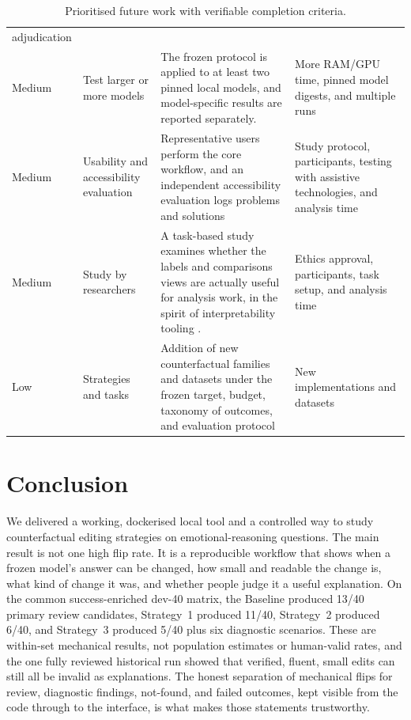 \documentclass[11pt,a4paper]{article}
\begin{document}
\begin{table}[!htbp]
\begin{tabularx}{\textwidth}{@{}L{1.05cm}L{2.5cm}Y Y@{}}
adjudication \\
Medium & Test larger or more models & The frozen protocol is applied to at least two
pinned local models, and model-specific results are reported separately. & More
RAM/GPU time, pinned model digests, and multiple runs \\
Medium & Usability and accessibility evaluation & Representative users perform the
core workflow, and an independent accessibility evaluation logs problems and solutions
& Study protocol, participants, testing with assistive technologies, and analysis time \\
Medium & Study by researchers & A task-based study examines whether the labels and
comparisons views are actually useful for analysis work, in the spirit of
interpretability tooling \cite{tenney2020}. & Ethics approval, participants, task setup, and analysis
time \\
Low & Strategies and tasks & Addition of new counterfactual families and datasets under
the frozen target, budget, taxonomy of outcomes, and evaluation protocol & New
implementations and datasets \\
\bottomrule
\end{tabularx}
\caption{Prioritised future work with verifiable completion criteria.}
\label{tab:future}
\end{table}

\clearpage

\section{Conclusion}

We delivered a working, dockerised local tool and a controlled way to study
counterfactual editing strategies on emotional-reasoning questions. The main result is
not one high flip rate. It is a reproducible workflow that shows when a frozen model's
answer can be changed, how small and readable the change is, what kind of change it
was, and whether people judge it a useful explanation. On the common success-enriched
dev-40 matrix, the Baseline produced 13/40 primary review candidates, Strategy~1
produced 11/40, Strategy~2 produced 6/40, and Strategy~3 produced 5/40 plus six
diagnostic scenarios. These are within-set mechanical results, not population estimates
or human-valid rates, and the one fully reviewed historical run showed that verified,
fluent, small edits can still all be invalid as explanations. The honest separation of
mechanical flips for review, diagnostic findings, not-found, and failed outcomes, kept
visible from the code through to the interface, is what makes those statements
trustworthy.
\end{document}
